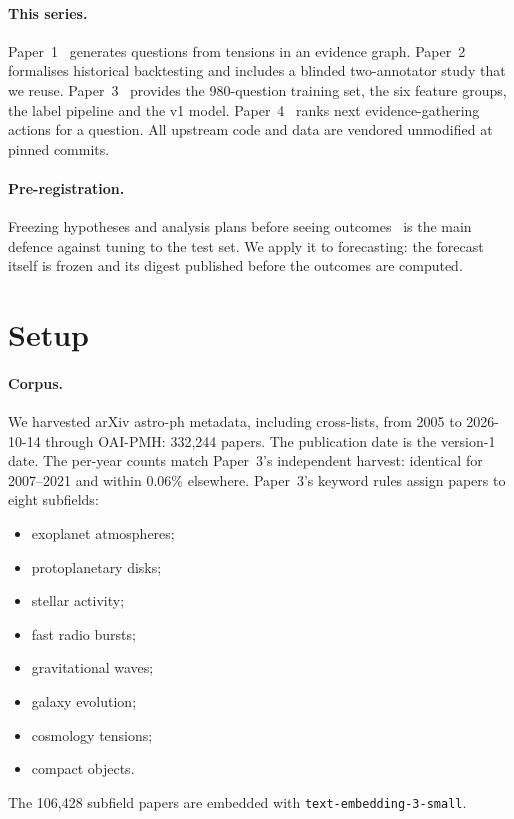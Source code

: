 \documentclass[11pt]{article}
\begin{document}
\paragraph{This series.} Paper~1~\cite{mao2026framework} generates questions
from tensions in an evidence graph. Paper~2~\cite{mao2026backtesting}
formalises historical backtesting and includes a blinded two-annotator study
that we reuse. Paper~3~\cite{mao2026succeed} provides the 980-question training set, the
six feature groups, the label pipeline and the v1 model. Paper~4~\cite{mao2026planner}
ranks next evidence-gathering actions for a question. All upstream code and
data are vendored unmodified at pinned commits.

\paragraph{Pre-registration.} Freezing hypotheses and analysis plans before
seeing outcomes~\cite{nosek2018} is the main defence against tuning to the test
set. We apply it to forecasting: the forecast itself is frozen and its digest
published before the outcomes are computed.

\section{Setup}\label{sec:setup}

\paragraph{Corpus.} We harvested arXiv astro-ph metadata, including
cross-lists, from 2005 to 2026-10-14 through OAI-PMH: 332,244 papers. The
publication date is the version-1 date. The per-year counts match Paper~3's
independent harvest: identical for 2007--2021 and within 0.06\% elsewhere.
Paper~3's keyword rules assign papers to eight subfields:
\begin{itemize}
\item exoplanet atmospheres;
\item protoplanetary disks;
\item stellar activity;
\item fast radio bursts;
\item gravitational waves;
\item galaxy evolution;
\item cosmology tensions;
\item compact objects.
\end{itemize}
The 106,428 subfield papers are embedded with \texttt{text-embedding-3-small}.
\end{document}
